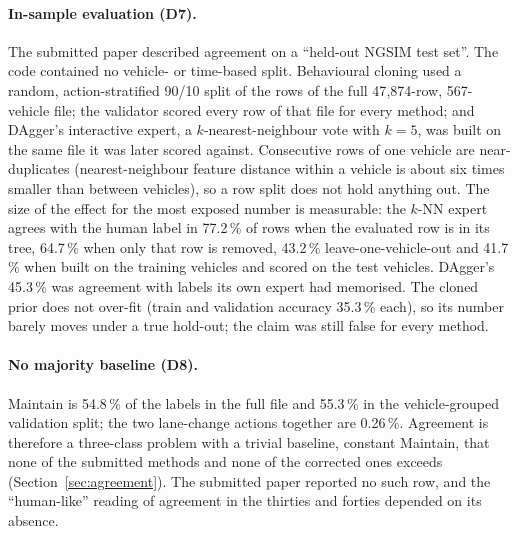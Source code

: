 \paragraph{In-sample evaluation (D7).}
The submitted paper described agreement on a ``held-out NGSIM test set''. The code contained no vehicle- or time-based split. Behavioural cloning used a random, action-stratified 90/10 split of the rows of the full 47{,}874-row, 567-vehicle file; the validator scored every row of that file for every method; and DAgger's interactive expert, a $k$-nearest-neighbour vote with $k=5$, was built on the same file it was later scored against. Consecutive rows of one vehicle are near-duplicates (nearest-neighbour feature distance within a vehicle is about six times smaller than between vehicles), so a row split does not hold anything out. The size of the effect for the most exposed number is measurable: the $k$-NN expert agrees with the human label in 77.2\,\% of rows when the evaluated row is in its tree, 64.7\,\% when only that row is removed, 43.2\,\% leave-one-vehicle-out and 41.7\,\% when built on the training vehicles and scored on the test vehicles. DAgger's 45.3\,\% was agreement with labels its own expert had memorised. The cloned prior does not over-fit (train and validation accuracy 35.3\,\% each), so its number barely moves under a true hold-out; the claim was still false for every method.

\paragraph{No majority baseline (D8).}
Maintain is 54.8\,\% of the labels in the full file and 55.3\,\% in the vehicle-grouped validation split; the two lane-change actions together are 0.26\,\%. Agreement is therefore a three-class problem with a trivial baseline, constant Maintain, that none of the submitted methods and none of the corrected ones exceeds (Section~\ref{sec:agreement}). The submitted paper reported no such row, and the ``human-like'' reading of agreement in the thirties and forties depended on its absence.

